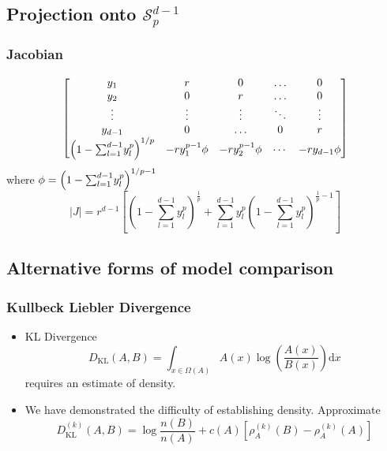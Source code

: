 \documentclass[aspectratio=169]{beamer}
\begin{document}
\subsection*{Projection onto $\mathcal{S}_p^{d-1}$}
\begin{frame}
  \frametitle{Jacobian}
  \begin{equation*}
    \begin{bmatrix}
      y_1 & r & 0 & \ldots & 0\\
      y_2 & 0 & r & \ldots & 0\\
      \vdots & \vdots & \vdots & \ddots & \vdots\\
      y_{d-1} & 0 & \ldots & 0 & r \\
      \left(1 - {\scriptsize\sum_{l=1}^{d-1}}y_l^p\right)^{1/p} &
        - ry_1^{p-1}\phi & -ry_2^{p-1}\phi & \cdots & -ry_{d-1}\phi
    \end{bmatrix}
  \end{equation*}
  where $\phi = \left(1 - {\scriptsize\sum_{l=1}^{d-1}}y_l^p\right)^{1/p - 1}$
  \pause
  \begin{equation*}
  \lvert J \rvert = r^{d-1}\left[\left(1 - {\textstyle\sum}_{l = 1}^{d-1}y_l^p\right)^{\frac{1}{p}} +
      {\textstyle\sum}_{l = 1}^{d-1}y_l^p\left(1 - {\textstyle\sum}_{l=1}^{d-1}
          y_l^p\right)^{\frac{1}{p} - 1}\right]
  \end{equation*}
\end{frame} %

\subsection*{Alternative forms of model comparison}
\begin{frame}
  \frametitle{Kullbeck Liebler Divergence}
  \begin{itemize}
    \item KL Divergence
      \begin{equation*}
        D_{\text{KL}}(A,B) = \int_{x\in \Omega(A)}A(x)\log\left(\frac{A(x)}{B(x)}\right)\text{d}x
      \end{equation*}
      requires an estimate of density.
    \pause
    \item We have demonstrated the difficulty of establishing density.  Approximate
      \begin{equation*}
      D_{\text{KL}}^{(k)}(A,B) = \log\frac{n(B)}{n(A)} + c(A) \left[\rho_A^{(k)}(B)
                                                      - \rho_A^{(k)}(A)\right]
      \end{equation*}
  \end{itemize}
\end{frame} %
\end{document}
